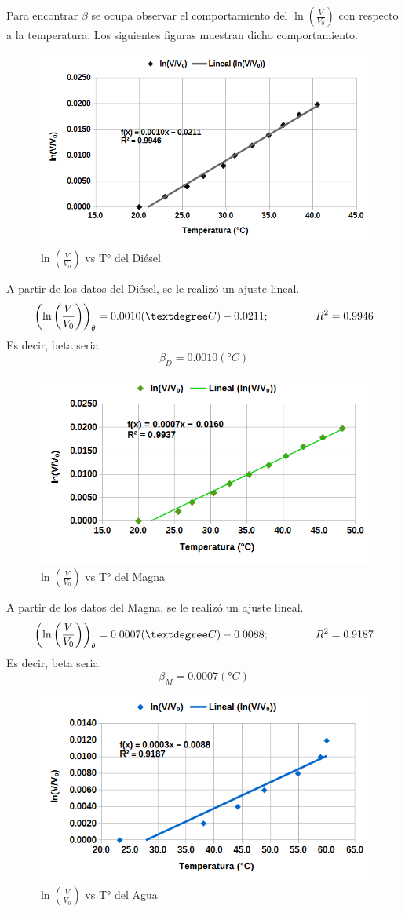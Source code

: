 \documentclass[12pt]{article}
\begin{document}
\hspace{0.75cm} Para encontrar $\beta$ se ocupa observar el comportamiento del  $\ln \left(\frac{V}{V_0} \right)$ con respecto a la temperatura. Los siguientes figuras muestran dicho comportamiento.

\begin{figure}[H]
\centering
\includegraphics[width=0.5\linewidth]{Diesel.png}
\caption{$\ln \left(\frac{V}{V_0} \right)$ vs T° del Diésel}
\end{figure}
A partir de los datos del Diésel, se le realizó un ajuste lineal.
\begin{equation}
\left(\ln \left(\frac{V}{V_0} \right) \right)_{\theta} = 0.0010 (°C) - 0.0211; \hspace{1.5cm} R^2 = 0.9946
\end{equation}
Es decir, beta seria:
$$\beta_{D} = 0.0010 (°C) $$
\begin{figure}[H]
\centering
\includegraphics[width=0.5\linewidth]{Magna.png}
\caption{$\ln \left(\frac{V}{V_0} \right)$ vs T° del Magna}
\end{figure}

A partir de los datos del Magna, se le realizó un ajuste lineal.
\begin{equation}
\left(\ln \left(\frac{V}{V_0} \right) \right)_{\theta} = 0.0007 (°C) - 0.0088; \hspace{1.5cm} R^2 = 0.9187
\end{equation}
Es decir, beta seria:
$$\beta_{M} = 0.0007 (°C) $$

\begin{figure}[H]
\centering
\includegraphics[width=0.5\linewidth]{Agua.png}
\caption{$\ln \left(\frac{V}{V_0} \right)$ vs T° del Agua}
\end{figure}
\end{document}
